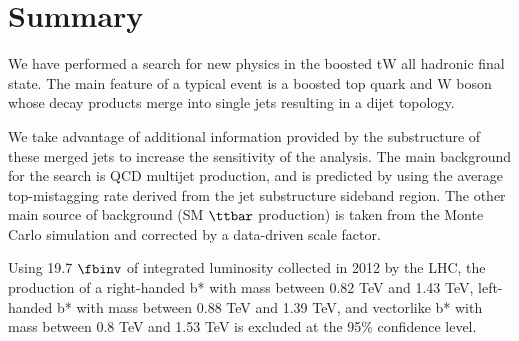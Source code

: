 \clearpage
\newpage
\chapter{Summary}
\label{sec:bssummary}
We have performed a search for new physics in the boosted tW all
hadronic final state.  The main feature of a typical event is a boosted top quark and W boson
whose decay products merge into single jets resulting in a dijet topology. 

We take advantage of additional information provided by the 
substructure of these merged jets  to increase the sensitivity of the analysis.  The main background for
the search is QCD multijet production, and is predicted by using the
average top-mistagging rate derived from the jet substructure sideband
region.  The other main source of background (SM $\ttbar$ production) is taken from 
the Monte Carlo simulation and corrected by a data-driven scale factor.

Using 19.7$~\fbinv$ of integrated luminosity collected in 2012 by the
LHC, the production of a right-handed b* with mass between 0.82 TeV and 1.43 TeV, 
left-handed b* with mass between 0.88 TeV and 1.39 TeV, 
and vectorlike b* with mass between 0.8 TeV and 1.53 TeV is excluded at the 95\% confidence level.

